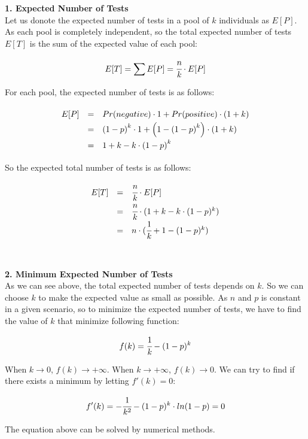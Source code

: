 \textbf{1. Expected Number of Tests}\\

Let us donote the expected number of tests in a pool of $k$ individuals as $E[P]$. As each pool is completely independent, so the total expected number of tests $E[T]$ is the sum of the expected value of each pool:

\[
  E[T] = \sum E[P] = \cfrac{n}{k} \cdot E[P]
\]

For each pool, the expected number of tests is as follows:

\[\def\arraystretch{1.5}
  \begin{array}{l l l}
        E[P] & = & Pr(negative) \cdot 1 + Pr(positive) \cdot (1 + k) \\
             & = & \left(1 - p\right)^k \cdot 1 + \left(1 - \left(1 - p \right)^k \right) \cdot \left(1 + k \right) \\
             & = & 1 + k - k \cdot \left(1 - p \right)^k
  \end{array}
\]

So the expected total number of tests is as follows:

\[\def\arraystretch{1.5}
  \begin{array}{l l l}
        E[T] & = & \cfrac{n}{k} \cdot E[P] \\
             & = & \cfrac{n}{k} \cdot ( 1 + k - k \cdot (1 - p )^k) \\
             & = & n \cdot ( \cfrac{1}{k} + 1 - (1 - p)^k )
  \end{array}
\]\\\\

\noindent
\textbf{2. Minimum Expected Number of Tests}\\

As we can see above, the total expected number of tests depends on $k$. So we can choose $k$ to make the expected value as small as possible. As $n$ and $p$ is constant in a given scenario, so to minimize the expected number of tests, we have to find the value of $k$ that minimize following function:

\[
  f(k) = \cfrac{1}{k} - (1 - p)^k
\]

When $k \rightarrow 0$, $f(k) \rightarrow +\infty$. When $k \rightarrow +\infty$, $f(k) \rightarrow 0$. We can try to find if there exists a minimum by letting $f'(k) = 0$:

\[
  f'(k) = -\cfrac{1}{k^2} - (1-p)^k \cdot ln(1-p) = 0
\]

The equation above can be solved by numerical methods.\\\\

